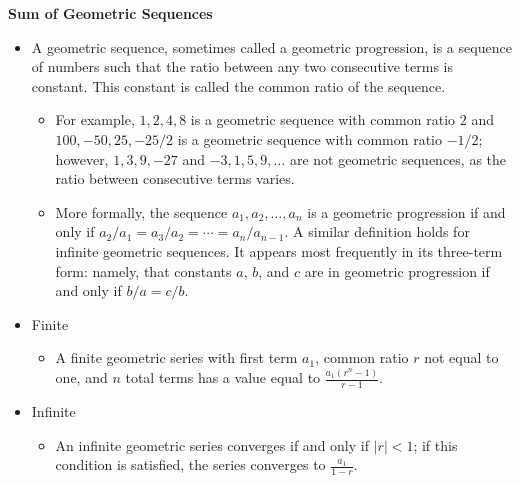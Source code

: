 \documentclass[11pt,letterpaper]{article}
\begin{document}
\begin{minipage}{\textwidth}
     \noindent \textbf{Sum of Geometric Sequences}
     \begin{itemize}
          \item A geometric sequence, sometimes called a geometric progression, is a sequence of numbers such that the ratio between any two consecutive terms is constant. This constant is called the common ratio of the sequence.
          \begin{itemize}
               \item For example, $1, 2, 4, 8$ is a geometric sequence with common ratio $2$ and $100, -50, 25, -25/2$ is a geometric sequence with common ratio $-1/2$; however, $1, 3, 9, -27$ and $-3, 1, 5, 9, \ldots$ are not geometric sequences, as the ratio between consecutive terms varies.
               \item More formally, the sequence $a_1, a_2, \ldots , a_n$ is a geometric progression if and only if $a_2 / a_1 = a_3 / a_2 = \cdots = a_n / a_{n-1}$. A similar definition holds for infinite geometric sequences. It appears most frequently in its three-term form: namely, that constants $a$, $b$, and $c$ are in geometric progression if and only if $b / a = c / b$.
          \end{itemize}
          \item Finite
          \begin{itemize}
               \item A finite geometric series with first term $a_1$, common ratio $r$ not equal to one, and $n$ total terms has a value equal to $\frac{a_1(r^n-1)}{r-1}$.
          \end{itemize}
          \item Infinite 
          \begin{itemize}
               \item An infinite geometric series converges if and only if $|r|<1$; if this condition is satisfied, the series converges to $\frac{a_1}{1-r}$.
          \end{itemize}
     \end{itemize}
\end{minipage}
\end{document}
